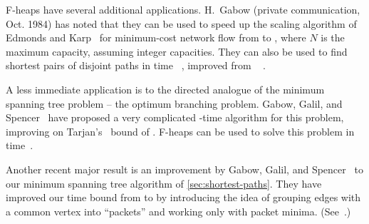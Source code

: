 F-heaps have several additional applications. H.~Gabow (private communication, Oct.
1984) has noted that they can be used to speed up the scaling algorithm of Edmonds
and Karp~\cite{EdmondsKarp1972} for minimum-cost network flow from  to , where \(N\) is
the maximum capacity, assuming integer capacities. They can also be used to find
shortest pairs of disjoint paths in  time~%
\cite{GabowStallman1985}, improved from ~%
\cite{SuurballeTarjan1984}.

A less immediate application is to the directed analogue of the minimum spanning tree
problem -- the optimum branching problem. Gabow, Galil, and Spencer~\cite{Gabow+1984}
have proposed a very complicated -time algorithm for this problem, improving on Tarjan's~\cite{Camerini+1979,
Tarjan1977} bound of . F-heaps can be used to solve
this problem in  time~\cite{Gabow+1986}.

Another recent major result is an improvement by Gabow, Galil, and Spencer~%
\cite{Gabow+1984} to our minimum spanning tree algorithm of
\autoref{sec:shortest-paths}. They have improved our time bound from  to  by introducing the idea of grouping edges with
a common vertex into ``packets'' and working only with packet minima.
(See~\cite{Gabow+1986}.)

